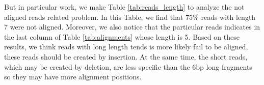 \documentclass[a4paper]{article}
\begin{document}
But in particular work, we make Table \ref{tab:reads_length} to analyze the not aligned reads related problem. In this Table, we find that 75\% reads with length 7 were not aligned. Moreover, we also notice that the particular reads indicates in the last column of  Table \ref{tab:alignments} whose length is 5. Based on these results, we think reads with long length tends is more likely fail to be aligned, these reads should be created by insertion. At the same time, the short reads, which may be created by deletion, are less specific than the 6bp long fragments so they may have more alignment positions.



\end{document}
